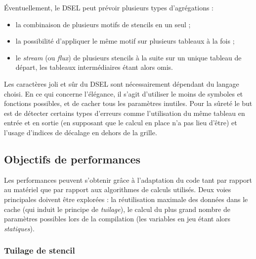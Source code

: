 Éventuellement, le DSEL peut prévoir plusieurs types d'agrégations :
\begin{itemize}
\item la combinaison de plusieurs motifs de stencils en un seul ;
\item la possibilité d'appliquer le même motif sur plusieurs tableaux à la fois ;
\item le \emph{stream} (ou \emph{flux}) de plusieurs stencils à la suite sur un unique tableau de départ, les tableaux intermédiaires étant alors omis.
\end{itemize}

Les caractères joli et sûr du DSEL sont nécessairement dépendant du langage choisi. En ce qui concerne l'élégance, il s'agit d'utiliser le moins de symboles et fonctions possibles, et de cacher tous les paramètres inutiles. Pour la sûreté le but est de détecter certains types d'erreurs comme l'utilisation du même tableau en entrée et en sortie (en supposant que le calcul en place n'a pas lieu d'être) et l'usage d'indices de décalage en dehors de la grille.

\subsection{Objectifs de performances}
\label{sec:obj_perf}

Les performances peuvent s'obtenir grâce à l'adaptation du code tant par rapport au matériel que par rapport aux algorithmes de calculs utilisés. Deux voies principales doivent être explorées : la réutilisation maximale des données dans le cache (qui induit le principe de \emph{tuilage}), le calcul du plus grand nombre de paramètres possibles lors de la compilation (les variables en jeu étant alors \emph{statiques}).

\subsubsection*{Tuilage de stencil} 

